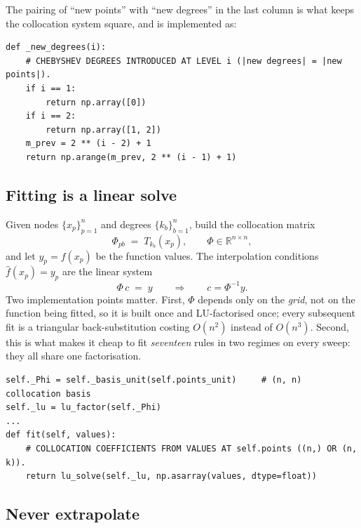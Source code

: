 \documentclass[11pt]{article}
\numberwithin{equation}{section}
\newcommand{\R}{\mathbb{R}}
\newcommand{\code}[1]{\texttt{\small #1}}
\theoremstyle{definition}
\theoremstyle{plain}
\theoremstyle{remark}
\begin{document}
The pairing of ``new points'' with ``new degrees'' in the last column is what keeps
the collocation system square, and is implemented as:

\begin{lstlisting}[caption={Degrees introduced at each level. \code{state\_grid.py}, \code{\_new\_degrees}.}]
def _new_degrees(i):
    # CHEBYSHEV DEGREES INTRODUCED AT LEVEL i (|new degrees| = |new points|).
    if i == 1:
        return np.array([0])
    if i == 2:
        return np.array([1, 2])
    m_prev = 2 ** (i - 2) + 1
    return np.arange(m_prev, 2 ** (i - 1) + 1)
\end{lstlisting}

\subsection{Fitting is a linear solve}
\label{sec:fitting}

Given nodes $\{x_p\}_{p=1}^{n}$ and degrees $\{k_b\}_{b=1}^{n}$, build the
collocation matrix
\begin{equation}
\Phi_{pb}\;=\;T_{k_b}(x_p),
\qquad
\Phi\in\R^{n\times n},
\label{eq:phi-1d}
\end{equation}
and let $y_p=f(x_p)$ be the function values. The interpolation conditions
$\hat f(x_p)=y_p$ are the linear system
\begin{equation}
\Phi\,c\;=\;y
\qquad\Longrightarrow\qquad
c=\Phi^{-1}y .
\label{eq:fit-1d}
\end{equation}
Two implementation points matter. First, $\Phi$ depends only on the \emph{grid}, not
on the function being fitted, so it is built once and LU-factorised once; every
subsequent fit is a triangular back-substitution costing $O(n^{2})$ instead of
$O(n^{3})$. Second, this is what makes it cheap to fit \emph{seventeen} rules in two
regimes on every sweep: they all share one factorisation.

\begin{lstlisting}[caption={One factorisation, many fits. \code{state\_grid.py}, \code{SmolyakGrid}.}]
self._Phi = self._basis_unit(self.points_unit)     # (n, n) collocation basis
self._lu = lu_factor(self._Phi)
...
def fit(self, values):
    # COLLOCATION COEFFICIENTS FROM VALUES AT self.points ((n,) OR (n, k)).
    return lu_solve(self._lu, np.asarray(values, dtype=float))
\end{lstlisting}

\subsection{Never extrapolate}
\end{document}
